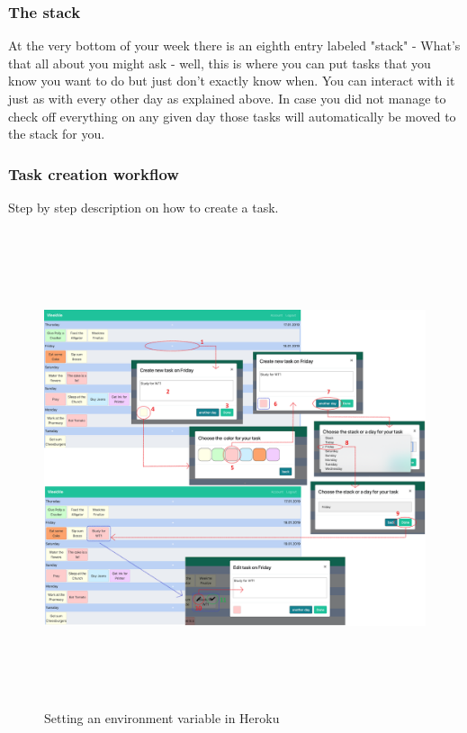 \subsubsection{The stack} 
At the very bottom of your week there is an eighth entry labeled "stack" - What's that all about you might ask - well, this is where you can put tasks that you know you want to do but just don't exactly know when.  You can interact with it just as with every other day as explained above.  
In case you did not manage to check off everything on any given day those tasks will automatically be moved to the stack for you.

\subsubsection{Task creation workflow}
Step by step description on how to create a task. 

	\begin{figure}[H] 
		\centering 
		\includegraphics[height=14cm]{figures/task_creation_workflow}    
		\caption[Task creation workflow]{Setting an environment variable in Heroku}     
		\label{fig: Task creation workflow}     
	\end{figure}  
	
